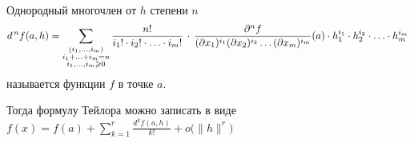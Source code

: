 \begin{opr}
	Однородный многочлен от $h$ степени $n$ 
	\[d^{\,n} f(a, h) = \sum_{\substack{(i_1, \ldots, i_m) \\ i_1 + \ldots + i_m = n \\ i_1, \ldots, i_m \geqslant 0}} \frac{n!}{i_1! \cdot i_2! \cdot \ldots \cdot i_m!}\, \cdot \, \frac{\partial^nf}{(\partial x_1)^{i_1} (\partial x_2)^{i_2} \ldots (\partial x_m)^{i_m}} (a) \cdot h_1^{i_1} \cdot h_2^{i_2} \cdot \ldots \cdot h_m^{i_m}\]
	называется
	функции $f$ в точке $a$.
\end{opr} %
 
Тогда формулу Тейлора можно записать в виде $\displaystyle f(x) = f(a) + \sum_{k = 1}^r \frac{d^kf(a, h)}{k!} + o\bigl(\|h\|^r\bigl)$
